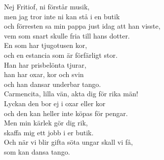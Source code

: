 \documentclass[a6paper, 10pt, twoside]{article}
\begin{document}
\begin{lyrics}
\newpage
\noindent
Nej Fritiof, ni förstår musik, \\
men jag tror inte ni kan stå i en butik \\
och förresten sa min pappa just idag att han visste, \\
vem som snart skulle fria till hans dotter. \\
En som har tjugotusen kor, \\
och en estancia som är förfärligt stor. \\
Han har prisbelönta tjurar, \\
han har oxar, kor och svin \\
och han dansar underbar tango. 
\vspace{5pt}\\
Carmencita, lilla vän, akta dig för rika män! \\
Lyckan den bor ej i oxar eller kor \\
och den kan heller inte köpas för pengar. \\
Men min kärlek gör dig rik, \\
skaffa mig ett jobb i er butik. \\
Och när vi blir gifta söta ungar skall vi få, \\
som kan dansa tango.
\end{lyrics}
	    
\end{document}
